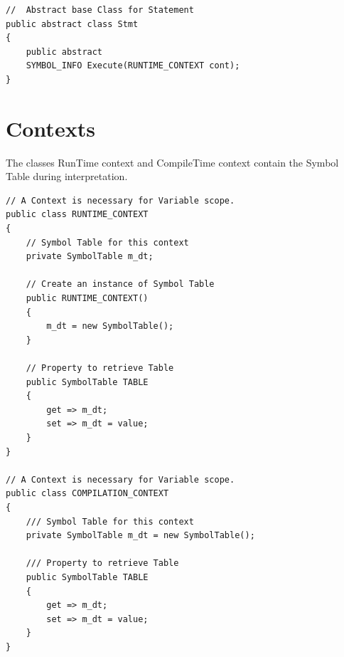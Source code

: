 \lstset{style=csharp}
\begin{lstlisting}
// 	Abstract base Class for Statement
public abstract class Stmt
{
	public abstract 
	SYMBOL_INFO Execute(RUNTIME_CONTEXT cont);     
}
\end{lstlisting}

\section{Contexts}
The classes RunTime context and CompileTime context contain the Symbol Table during interpretation.
\lstset{style=csharp}
\begin{lstlisting}
// A Context is necessary for Variable scope.
public class RUNTIME_CONTEXT
{
	// Symbol Table for this context
	private SymbolTable m_dt;
	
	// Create an instance of Symbol Table
	public RUNTIME_CONTEXT()
	{
		m_dt = new SymbolTable();
	}
	
	// Property to retrieve Table
	public SymbolTable TABLE
	{
		get => m_dt;
		set => m_dt = value;
	}
}

// A Context is necessary for Variable scope.
public class COMPILATION_CONTEXT
{
    /// Symbol Table for this context
    private SymbolTable m_dt = new SymbolTable();

    /// Property to retrieve Table
    public SymbolTable TABLE
    {
        get => m_dt;
        set => m_dt = value;
    }
}
\end{lstlisting}
